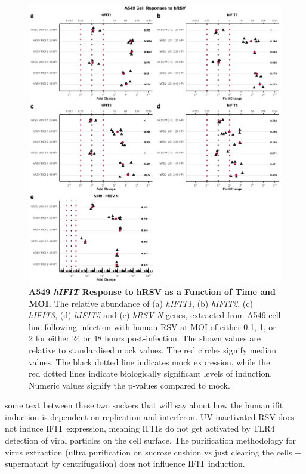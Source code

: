 \begin{figure}
    \centering
    \includegraphics[width=1\linewidth]{06. Chapter 1/Figs/01. Induction/05. a549_hrsv_timepoints.pdf}
    \caption[A549 \textit{hIFIT} Response to hRSV as a Function of Time and MOI.]{\textbf{A549 \textit{hIFIT} Response to hRSV as a Function of Time and MOI.} The relative abundance of (a) \textit{hIFIT1}, (b) \textit{hIFIT2}, (c) \textit{hIFIT3}, (d) \textit{hIFIT5} and (e) \textit{hRSV N} genes, extracted from A549 cell line following infection with human RSV at MOI of either 0.1, 1, or 2 for either 24 or 48 hours post-infection. The shown values are relative to standardised mock values. The red circles signify median values. The black dotted line indicates mock expression, while the red dotted lines indicate biologically significant levels of induction. Numeric values signify the p-values compared to mock.}
    \label{A549 response to hRSV timepoints}
\end{figure}

some text between these two suckers that will say about how the human ifit induction is dependent on replication and interferon. UV inactivated RSV does not induce IFIT expression, meaning IFITs do not get activated by TLR4 detection of viral particles on the cell surface. The purification methodology for virus extraction (ultra purification on sucrose cushion vs just clearing the cells + supernatant by centrifugation) does not influence IFIT induction.


